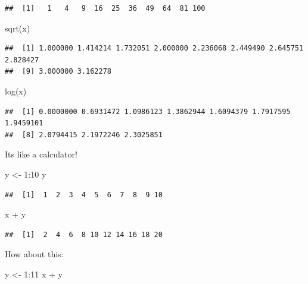 \documentclass[
]{book}
\newenvironment{Shaded}{\begin{snugshade}}{\end{snugshade}}
\newcommand{\DecValTok}[1]{\textcolor[rgb]{0.00,0.00,0.81}{#1}}
\newcommand{\FunctionTok}[1]{\textcolor[rgb]{0.00,0.00,0.00}{#1}}
\newcommand{\NormalTok}[1]{#1}
\newcommand{\OtherTok}[1]{\textcolor[rgb]{0.56,0.35,0.01}{#1}}
\newcommand{\SpecialCharTok}[1]{\textcolor[rgb]{0.00,0.00,0.00}{#1}}
\theoremstyle{definition}
\theoremstyle{definition}
\theoremstyle{definition}
\theoremstyle{definition}
\theoremstyle{remark}
\begin{document}
\begin{verbatim}
##  [1]   1   4   9  16  25  36  49  64  81 100
\end{verbatim}

\begin{Shaded}
\begin{Highlighting}[]
\FunctionTok{sqrt}\NormalTok{(x)}
\end{Highlighting}
\end{Shaded}

\begin{verbatim}
##  [1] 1.000000 1.414214 1.732051 2.000000 2.236068 2.449490 2.645751 2.828427
##  [9] 3.000000 3.162278
\end{verbatim}

\begin{Shaded}
\begin{Highlighting}[]
\FunctionTok{log}\NormalTok{(x)}
\end{Highlighting}
\end{Shaded}

\begin{verbatim}
##  [1] 0.0000000 0.6931472 1.0986123 1.3862944 1.6094379 1.7917595 1.9459101
##  [8] 2.0794415 2.1972246 2.3025851
\end{verbatim}

Its like a calculator!

\begin{Shaded}
\begin{Highlighting}[]
\NormalTok{y }\OtherTok{\textless{}{-}} \DecValTok{1}\SpecialCharTok{:}\DecValTok{10}
\NormalTok{y}
\end{Highlighting}
\end{Shaded}

\begin{verbatim}
##  [1]  1  2  3  4  5  6  7  8  9 10
\end{verbatim}

\begin{Shaded}
\begin{Highlighting}[]
\NormalTok{x }\SpecialCharTok{+}\NormalTok{ y}
\end{Highlighting}
\end{Shaded}

\begin{verbatim}
##  [1]  2  4  6  8 10 12 14 16 18 20
\end{verbatim}

How about this:

\begin{Shaded}
\begin{Highlighting}[]
\NormalTok{y }\OtherTok{\textless{}{-}} \DecValTok{1}\SpecialCharTok{:}\DecValTok{11}
\NormalTok{x }\SpecialCharTok{+}\NormalTok{ y}
\end{Highlighting}
\end{Shaded}
\end{document}
